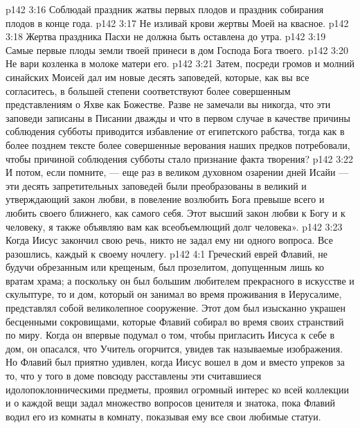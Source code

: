 \vs p142 3:16 \bibnobreakspace Соблюдай праздник жатвы первых плодов и праздник собирания плодов в конце года.
\vs p142 3:17 \bibnobreakspace Не изливай крови жертвы Моей на квасное.
\vs p142 3:18 \bibnobreakspace Жертва праздника Пасхи не должна быть оставлена до утра.
\vs p142 3:19 \bibnobreakspace Самые первые плоды земли твоей принеси в дом Господа Бога твоего.
\vs p142 3:20 \bibnobreakspace Не вари козленка в молоке матери его.
\vs p142 3:21 \pc Затем, посреди громов и молний синайских Моисей дал им новые десять заповедей, которые, как вы все согласитесь, в большей степени соответствуют более совершенным представлениям о Яхве как Божестве. Разве не замечали вы никогда, что эти заповеди записаны в Писании дважды и что в первом случае в качестве причины соблюдения субботы приводится избавление от египетского рабства, тогда как в более позднем тексте более совершенные верования наших предков потребовали, чтобы причиной соблюдения субботы стало признание факта творения?
\vs p142 3:22 И потом, если помните, --- еще раз в великом духовном озарении дней Исайи --- эти десять запретительных заповедей были преобразованы в великий и утверждающий закон любви, в повеление возлюбить Бога превыше всего и любить своего ближнего, как самого себя. Этот высший закон любви к Богу и к человеку, я также объявляю вам как всеобъемлющий долг человека».
\vs p142 3:23 \pc Когда Иисус закончил свою речь, никто не задал ему ни одного вопроса. Все разошлись, каждый к своему ночлегу.
\vs p142 4:1 Греческий еврей Флавий, не будучи обрезанным или крещеным, был прозелитом, допущенным лишь ко вратам храма; а поскольку он был большим любителем прекрасного в искусстве и скульптуре, то и дом, который он занимал во время проживания в Иерусалиме, представлял собой великолепное сооружение. Этот дом был изысканно украшен бесценными сокровищами, которые Флавий собирал во время своих странствий по миру. Когда он впервые подумал о том, чтобы пригласить Иисуса к себе в дом, он опасался, что Учитель огорчится, увидев так называемые изображения. Но Флавий был приятно удивлен, когда Иисус вошел в дом и вместо упреков за то, что у того в доме повсюду расставлены эти считавшиеся идолопоклонническими предметы, проявил огромный интерес ко всей коллекции и о каждой вещи задал множество вопросов ценителя и знатока, пока Флавий водил его из комнаты в комнату, показывая ему все свои любимые статуи.

